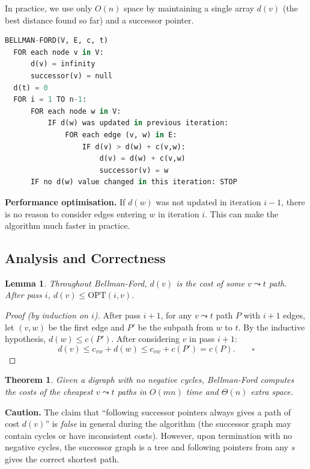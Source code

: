 \documentclass[12pt,a4paper]{report}
\newtheorem{theorem}{Theorem}
\newtheorem{lemma}{Lemma}
\begin{document}
In practice, we use only $O(n)$ space by maintaining a single array $d(v)$ (the best distance
found so far) and a successor pointer.

\begin{lstlisting}[language=Python]
BELLMAN-FORD(V, E, c, t)
  FOR each node v in V:
      d(v) = infinity
      successor(v) = null
  d(t) = 0
  FOR i = 1 TO n-1:
      FOR each node w in V:
          IF d(w) was updated in previous iteration:
              FOR each edge (v, w) in E:
                  IF d(v) > d(w) + c(v,w):
                      d(v) = d(w) + c(v,w)
                      successor(v) = w
      IF no d(w) value changed in this iteration: STOP
\end{lstlisting}

\textbf{Performance optimisation.} If $d(w)$ was not updated in iteration $i - 1$, there is
no reason to consider edges entering $w$ in iteration $i$. This can make the algorithm much
faster in practice.

\subsection{Analysis and Correctness}

\begin{lemma}
Throughout Bellman-Ford, $d(v)$ is the cost of \emph{some} $v \leadsto t$ path. After pass
$i$, $d(v) \leq \text{OPT}(i, v)$.
\end{lemma}

\begin{proof}[Proof (by induction on $i$)]
After pass $i+1$, for any $v \leadsto t$ path $P$ with $i+1$ edges, let $(v, w)$ be the
first edge and $P'$ be the subpath from $w$ to $t$. By the inductive hypothesis,
$d(w) \leq c(P')$. After considering $v$ in pass $i+1$:
\[
    d(v) \leq c_{vw} + d(w) \leq c_{vw} + c(P') = c(P). \qquad \square
\]
\end{proof}

\begin{theorem}
Given a digraph with no negative cycles, Bellman-Ford computes the costs of the cheapest
$v \leadsto t$ paths in $O(mn)$ time and $\Theta(n)$ extra space.
\end{theorem}

\textbf{Caution.} The claim that ``following successor pointers always gives a path of cost
$d(v)$'' is \emph{false} in general during the algorithm (the successor graph may contain
cycles or have inconsistent costs). However, upon termination with no negative cycles, the
successor graph is a tree and following pointers from any $s$ gives the correct shortest path.
\end{document}
